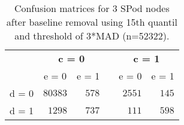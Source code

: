 \begin{table}[!tbp]
\caption{Confusion matrices for 3 SPod nodes after baseline 
      removal using 15th quantil and threshold of 3*MAD (n=52322).\label{conf}} 
\begin{center}
\begin{tabular}{lrrcrr}
\hline\hline
\multicolumn{1}{l}{\bfseries }&\multicolumn{2}{c}{\bfseries c = 0}&\multicolumn{1}{c}{\bfseries }&\multicolumn{2}{c}{\bfseries c = 1}\tabularnewline
\cline{2-3} \cline{5-6}
\multicolumn{1}{l}{}&\multicolumn{1}{c}{e = 0}&\multicolumn{1}{c}{e = 1}&\multicolumn{1}{c}{}&\multicolumn{1}{c}{e = 0}&\multicolumn{1}{c}{e = 1}\tabularnewline
\hline
d = 0&$80383$&$578$&&$2551$&$145$\tabularnewline
d = 1&$ 1298$&$737$&&$ 111$&$598$\tabularnewline
\hline
\end{tabular}\end{center}
\end{table}
